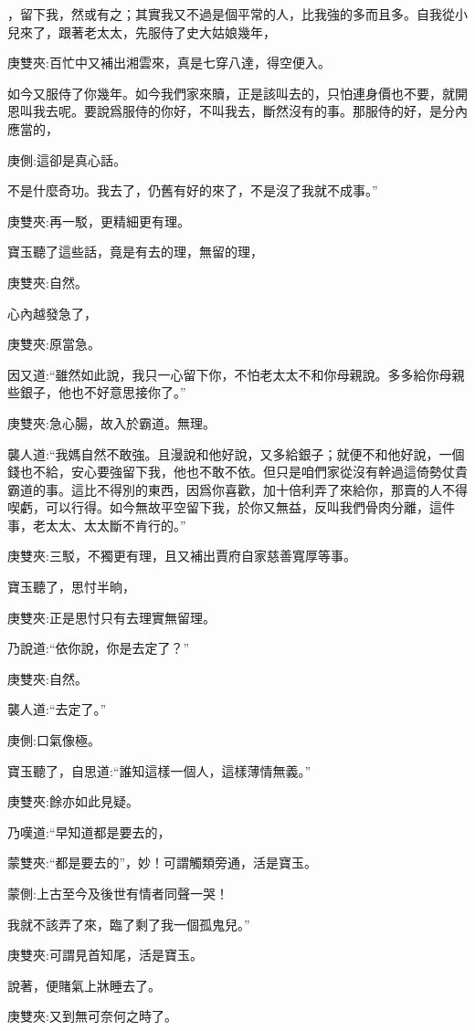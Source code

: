 \begin{parag}
，留下我，然或有之；其實我又不過是個平常的人，比我強的多而且多。自我從小兒來了，跟著老太太，先服侍了史大姑娘幾年，\begin{note}庚雙夾:百忙中又補出湘雲來，真是七穿八達，得空便入。\end{note}如今又服侍了你幾年。如今我們家來贖，正是該叫去的，只怕連身價也不要，就開恩叫我去呢。要說爲服侍的你好，不叫我去，斷然沒有的事。那服侍的好，是分內應當的，\begin{note}庚側:這卻是真心話。\end{note}不是什麼奇功。我去了，仍舊有好的來了，不是沒了我就不成事。”\begin{note}庚雙夾:再一駁，更精細更有理。\end{note}寶玉聽了這些話，竟是有去的理，無留的理，\begin{note}庚雙夾:自然。\end{note}心內越發急了，\begin{note}庚雙夾:原當急。\end{note}因又道:“雖然如此說，我只一心留下你，不怕老太太不和你母親說。多多給你母親些銀子，他也不好意思接你了。”\begin{note}庚雙夾:急心腸，故入於霸道。無理。\end{note}襲人道:“我媽自然不敢強。且漫說和他好說，又多給銀子；就便不和他好說，一個錢也不給，安心要強留下我，他也不敢不依。但只是咱們家從沒有幹過這倚勢仗貴霸道的事。這比不得別的東西，因爲你喜歡，加十倍利弄了來給你，那賣的人不得喫虧，可以行得。如今無故平空留下我，於你又無益，反叫我們骨肉分離，這件事，老太太、太太斷不肯行的。”\begin{note}庚雙夾:三駁，不獨更有理，且又補出賈府自家慈善寬厚等事。\end{note}寶玉聽了，思忖半晌，\begin{note}庚雙夾:正是思忖只有去理實無留理。\end{note}乃說道:“依你說，你是去定了？”\begin{note}庚雙夾:自然。\end{note}襲人道:“去定了。”\begin{note}庚側:口氣像極。\end{note}寶玉聽了，自思道:“誰知這樣一個人，這樣薄情無義。”\begin{note}庚雙夾:餘亦如此見疑。\end{note}乃嘆道:“早知道都是要去的，\begin{note}蒙雙夾:“都是要去的”，妙！可謂觸類旁通，活是寶玉。\end{note}\begin{note}蒙側:上古至今及後世有情者同聲一哭！\end{note}我就不該弄了來，臨了剩了我一個孤鬼兒。”\begin{note}庚雙夾:可謂見首知尾，活是寶玉。\end{note}說著，便賭氣上牀睡去了。\begin{note}庚雙夾:又到無可奈何之時了。\end{note}
\end{parag}


